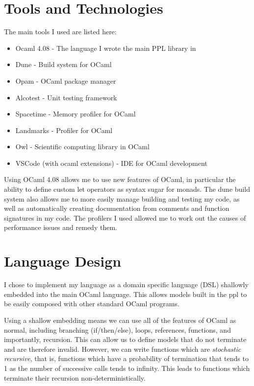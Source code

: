 \section{Tools and Technologies}
The main tools I used are listed here:
\begin{itemize}
    \item Ocaml 4.08 - The language I wrote the main PPL library in
    \item Dune - Build system for OCaml
    \item Opam - OCaml package manager
    \item Alcotest - Unit testing framework
    \item Spacetime - Memory profiler for OCaml
    \item Landmarks - Profiler for OCaml
    \item Owl - Scientific computing library in OCaml
    \item VSCode (with ocaml extensions) - IDE for OCaml development
\end{itemize}

Using OCaml 4.08 allows me to use new features of OCaml, in particular the ability to define custom let operators as syntax sugar for monads. The dune build system also allows me to more easily manage building and testing my code, as well as automatically creating documentation from comments and function signatures in my code. The profilers I used allowed me to work out the causes of performance issues and remedy them. 


\section{Language Design}
I chose to implement my language as a domain specific language (DSL) shallowly embedded into the main OCaml language. This allows models built in the ppl to be easily composed with other standard OCaml programs.

Using a shallow embedding means we can use all of the features of OCaml as normal, including branching (if/then/else), loops, references, functions, and importantly, recursion. This can allow us to define models that do not terminate and are therefore invalid. However, we can write functions which are \textit{stochastic recursive}, that is, functions which have a probability of termination that tends to 1 as the number of successive calls tends to infinity. This leads to functions which terminate their recursion non-deterministically.

